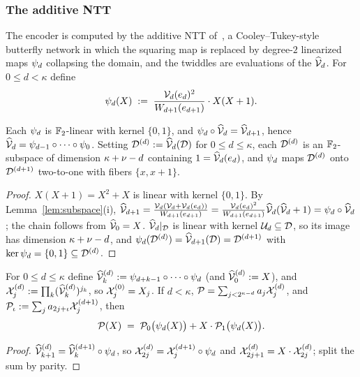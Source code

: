 \subsubsection{The additive NTT}\label{sec:ntt}

The encoder is computed by the additive NTT of~\cite{LCH14}, a Cooley--Tukey-style butterfly network in which the squaring map is replaced by degree-$2$ linearized maps $\psi_d$ collapsing the domain, and the twiddles are evaluations of the $\widehat{\mathcal{V}}_{d}$. For $0 \le d < \kappa$ define
\[
\psi_d(X) \;:=\; \frac{\mathcal{V}_d(e_d)^2}{W_{d+1}(e_{d+1})} \cdot X(X+1).
\]

\begin{lemma}\label{lem:chain}
Each $\psi_d$ is $\mathbb{F}_2$-linear with kernel $\{0,1\}$, and $\psi_d \circ \widehat{\mathcal{V}}_{d} = \widehat{\mathcal{V}}_{d+1}$, hence $\widehat{\mathcal{V}}_{d} = \psi_{d-1} \circ \dots \circ \psi_0$. Setting $\mathcal{D}^{(d)} := \widehat{\mathcal{V}}_{d}(\mathcal{D})$ for $0 \le d \le \kappa$, each $\mathcal{D}^{(d)}$ is an $\mathbb{F}_2$-subspace of dimension $\kappa + \nu - d$ containing $1 = \widehat{\mathcal{V}}_{d}(e_d)$, and $\psi_d$ maps $\mathcal{D}^{(d)}$ onto $\mathcal{D}^{(d+1)}$ two-to-one with fibers $\{x, x+1\}$.
\end{lemma}

\begin{proof}
$X(X+1) = X^2 + X$ is linear with kernel $\{0,1\}$. By Lemma~\ref{lem:subspace}(i), $\widehat{\mathcal{V}}_{d+1} = \tfrac{\mathcal{V}_d (\mathcal{V}_d + \mathcal{V}_d(e_d))}{W_{d+1}(e_{d+1})} = \tfrac{\mathcal{V}_d(e_d)^2}{W_{d+1}(e_{d+1})} \widehat{\mathcal{V}}_{d}(\widehat{\mathcal{V}}_{d} + 1) = \psi_d \circ \widehat{\mathcal{V}}_{d}$; the chain follows from $\widehat{\mathcal{V}}_{0} = X$. $\widehat{\mathcal{V}}_{d}|_{\mathcal{D}}$ is linear with kernel $\mathcal{U}_d \subseteq \mathcal{D}$, so its image has dimension $\kappa + \nu - d$, and $\psi_d(\mathcal{D}^{(d)}) = \widehat{\mathcal{V}}_{d+1}(\mathcal{D}) = \mathcal{D}^{(d+1)}$ with $\ker \psi_d = \{0,1\} \subseteq \mathcal{D}^{(d)}$.
\end{proof}

\begin{lemma}\label{lem:evenodd}
For $0 \le d \le \kappa$ define $\widehat{\mathcal{V}}_{k}^{(d)} := \psi_{d+k-1} \circ \dots \circ \psi_d$ (and $\widehat{\mathcal{V}}_{0}^{(d)} := X$), and $\mathcal{X}^{(d)}_j := \prod_k (\widehat{\mathcal{V}}_{k}^{(d)})^{j_k}$, so $\mathcal{X}^{(0)}_j = X_j$. If $d < \kappa$, $\mathcal{P} = \sum_{j < 2^{\kappa-d}} a_j \mathcal{X}^{(d)}_j$, and $\mathcal{P}_\iota := \sum_j a_{2j+\iota} \mathcal{X}^{(d+1)}_j$, then
\[
\mathcal{P}(X) \;=\; \mathcal{P}_0\bigl(\psi_d(X)\bigr) + X \cdot \mathcal{P}_1\bigl(\psi_d(X)\bigr).
\]
\end{lemma}

\begin{proof}
$\widehat{\mathcal{V}}_{k+1}^{(d)} = \widehat{\mathcal{V}}_{k}^{(d+1)} \circ \psi_d$, so $\mathcal{X}^{(d)}_{2j} = \mathcal{X}^{(d+1)}_j \circ \psi_d$ and $\mathcal{X}^{(d)}_{2j+1} = X \cdot \mathcal{X}^{(d)}_{2j}$; split the sum by parity.
\end{proof}


